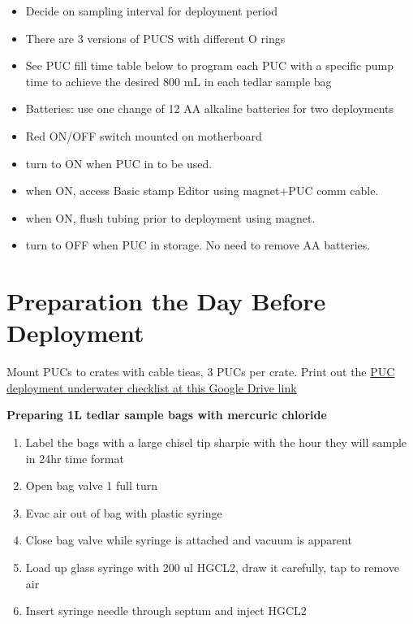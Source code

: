 \documentclass[]{book}
\providecommand{\tightlist}{%
  \setlength{\itemsep}{0pt}\setlength{\parskip}{0pt}}
\begin{document}
\begin{itemize}
\item
  Decide on sampling interval for deployment period
\item
  There are 3 versions of PUCS with different O rings
\item
  See PUC fill time table below to program each PUC with a specific pump
  time to achieve the desired 800 mL in each tedlar sample bag
\item
  Batteries: use one change of 12 AA alkaline batteries for two
  deployments
\item
  Red ON/OFF switch mounted on motherboard
\item
  turn to ON when PUC in to be used.
\item
  when ON, access Basic stamp Editor using magnet+PUC comm cable.
\item
  when ON, flush tubing prior to deployment using magnet.
\item
  turn to OFF when PUC in storage. No need to remove AA batteries.
\end{itemize}

\section{Preparation the Day Before
Deployment}\label{preparation-the-day-before-deployment}

Mount PUCs to crates with cable tieas, 3 PUCs per crate. Print out the
\href{https://drive.google.com/drive/folders/1X6fAG4OIDs66Ji5xzYsX8JySqhkSs5k-}{PUC
deployment underwater checklist at this Google Drive link}

\textbf{Preparing 1L tedlar sample bags with mercuric chloride}

\begin{enumerate}
\def\labelenumi{\arabic{enumi}.}
\tightlist
\item
  Label the bags with a large chisel tip sharpie with the hour they will
  sample in 24hr time format
\item
  Open bag valve 1 full turn
\item
  Evac air out of bag with plastic syringe
\item
  Close bag valve while syringe is attached and vacuum is apparent
\item
  Load up glass syringe with 200 ul HGCL2, draw it carefully, tap to
  remove air
\item
  Insert syringe needle through septum and inject HGCL2
\end{enumerate}
\end{document}
